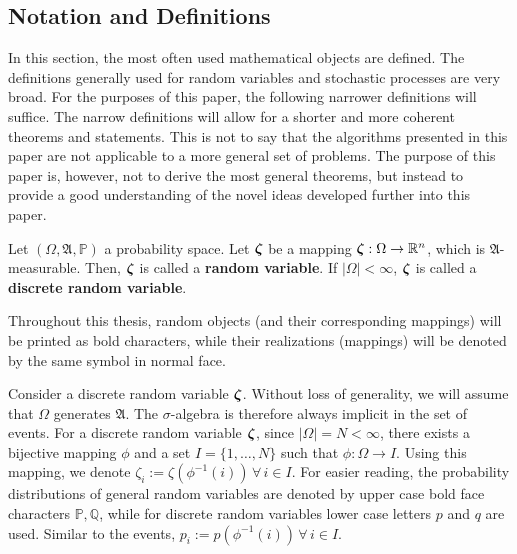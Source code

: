 \subsection{Notation and Definitions}
In this section, the most often used mathematical objects are defined.
The definitions generally used for random variables and stochastic processes are very broad.
For the purposes of this paper, the following narrower definitions will suffice.
The narrow definitions will allow for a shorter and more coherent theorems and statements.
This is not to say that the algorithms presented in this paper are not applicable to a more general set of problems.
The purpose of this paper is, however, not to derive the most general theorems, but instead to provide a good understanding of the novel ideas developed further into this paper.
\begin{definition}
  \label{def:random_variable}
  Let $(\Omega, \mathfrak{A}, \mathbb{P})$ a probability space.
  Let $\boldsymbol\zeta$ be a mapping $\boldsymbol\zeta:\Omega\rightarrow\mathbb{R}^n$, which is $\mathfrak{A}$-measurable.
  Then, $\boldsymbol\zeta$ is called a \textbf{random variable}.
  If $|\Omega|<\infty$, $\boldsymbol\zeta$ is called a \textbf{discrete random variable}.
  \end{definition}
\begin{remark}
  Throughout this thesis, random objects (and their corresponding mappings) will be printed as bold characters, while their realizations (mappings) will be denoted by the same symbol in normal face.
\end{remark}
\begin{remark}
  \label{remark:discrete-randvar-indexsets}
  Consider a discrete random variable $\boldsymbol\zeta$.
  Without loss of generality, we will assume that $\Omega$ generates $\mathfrak{A}$.
  The $\sigma$-algebra is therefore always implicit in the set of events.
  For a discrete random variable $\boldsymbol\zeta$, since $|\Omega|=N<\infty$, there exists a bijective mapping $\phi$ and a set $I=\{1,\ldots, N\}$ such that $\phi:\Omega \rightarrow I$.
  Using this mapping, we denote $\zeta_i := \zeta(\phi^{-1}(i))\,\forall\,i\in I$.
  For easier reading, the probability distributions of general random variables are denoted by upper case bold face characters $\mathbb{P,Q}$, while for discrete random variables lower case letters $p$ and $q$ are used.
  Similar to the events, $p_i := p(\phi^{-1}(i))\,\forall\,i\in I$.
\end{remark}
